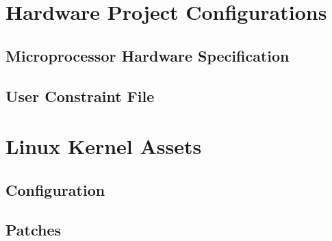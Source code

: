 \appendix 

\chapter{Hardware Project Configurations}

\section{Microprocessor Hardware Specification}

\section{User Constraint File}



\chapter{Linux Kernel Assets}

\section{Configuration}

\section{Patches}